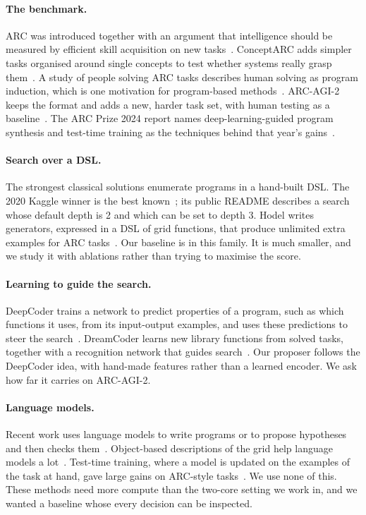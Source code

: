 \documentclass[sigconf,nonacm]{acmart}
\begin{document}
\paragraph{The benchmark.} ARC was introduced together with an argument that intelligence should be measured by efficient skill acquisition on new tasks~\cite{chollet2019measure}. ConceptARC adds simpler tasks organised around single concepts to test whether systems really grasp them~\cite{moskvichev2023conceptarc}. A study of people solving ARC tasks describes human solving as program induction, which is one motivation for program-based methods~\cite{johnson2021fast}. ARC-AGI-2 keeps the format and adds a new, harder task set, with human testing as a baseline~\cite{chollet2025arcagi2}. The ARC Prize 2024 report names deep-learning-guided program synthesis and test-time training as the techniques behind that year's gains~\cite{chollet2024arcprize}.

\paragraph{Search over a DSL.} The strongest classical solutions enumerate programs in a hand-built DSL. The 2020 Kaggle winner is the best known~\cite{wind2020arcsolution}; its public README describes a search whose default depth is 2 and which can be set to depth 3. Hodel writes generators, expressed in a DSL of grid functions, that produce unlimited extra examples for ARC tasks~\cite{hodel2024rearc}. Our baseline is in this family. It is much smaller, and we study it with ablations rather than trying to maximise the score.

\paragraph{Learning to guide the search.} DeepCoder trains a network to predict properties of a program, such as which functions it uses, from its input-output examples, and uses these predictions to steer the search~\cite{balog2016deepcoder}. DreamCoder learns new library functions from solved tasks, together with a recognition network that guides search~\cite{ellis2020dreamcoder}. Our proposer follows the DeepCoder idea, with hand-made features rather than a learned encoder. We ask how far it carries on ARC-AGI-2.

\paragraph{Language models.} Recent work uses language models to write programs or to propose hypotheses and then checks them~\cite{wang2023hypothesis,butt2024codeit}. Object-based descriptions of the grid help language models a lot~\cite{xu2023llmarc}. Test-time training, where a model is updated on the examples of the task at hand, gave large gains on ARC-style tasks~\cite{akyurek2024ttt}. We use none of this. These methods need more compute than the two-core setting we work in, and we wanted a baseline whose every decision can be inspected.
\end{document}
